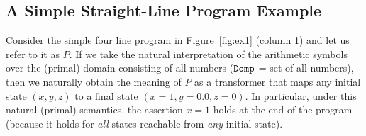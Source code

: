 \documentclass[preprint]{sig-alternate-05-2015}
\newtheorem{remark}{Remark}
\def\domp{{\tt{Domp}}}
\begin{document}
\subsection{A Simple Straight-Line Program Example}

Consider the simple four line program in
Figure~\ref{fig:ex1} (column 1) and let us refer to it as $P$.
If we take the natural interpretation of the arithmetic
symbols over the (primal) domain consisting of all numbers
($\domp$ = set of all numbers), then we naturally obtain the
meaning of $P$ as a transformer that
maps any initial state 
$(x,y,z)$ to a final state
$(x=1, y=0.0, z=0)$. 
In particular, under this natural (primal) semantics, the assertion
$x=1$ holds at the end of the program (because it holds for
{\em{all}} states reachable from {\em{any}} initial state).

\end{document}

